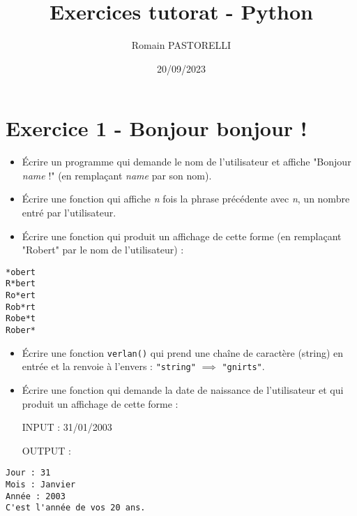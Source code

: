 \documentclass[11pt]{article}
\author{Romain PASTORELLI}
\date{20/09/2023}
\title{Exercices tutorat - Python}
\begin{document}
\maketitle

\section{Exercice 1 - Bonjour bonjour !}
\label{sec:orga74a690}
\begin{itemize}
\item Écrire un programme qui demande le nom de l'utilisateur et affiche "Bonjour \emph{name} !" (en remplaçant \emph{name} par son nom).
\item Écrire une fonction qui affiche \emph{n} fois la phrase précédente avec \emph{n}, un nombre entré par l'utilisateur.
\item Écrire une fonction qui produit un affichage de cette forme (en remplaçant "Robert" par le nom de l'utilisateur) :
\end{itemize}
\begin{verbatim}
*obert
R*bert
Ro*ert
Rob*rt
Robe*t
Rober*
\end{verbatim}
\begin{itemize}
\item Écrire une fonction \texttt{verlan()} qui prend une chaîne de caractère (string) en entrée et la renvoie à l'envers : \texttt{"string"} \(\implies\) \texttt{"gnirts"}.
\item Écrire une fonction qui demande la date de naissance de l'utilisateur et qui produit un affichage de cette forme :

INPUT : 31/01/2003

OUTPUT :
\end{itemize}

\begin{verbatim}
Jour : 31
Mois : Janvier
Année : 2003
C'est l'année de vos 20 ans.
\end{verbatim}
\end{document}
